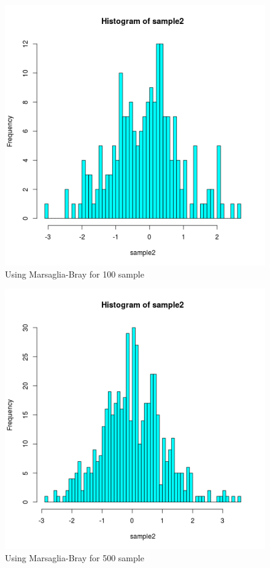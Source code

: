 \documentclass{article}
\begin{document}
		
			\begin{figure}
  			\includegraphics[width=\linewidth]{pic/que1_hund_2.png}
 			 \caption{Using Marsaglia-Bray for 100 sample} 
  			\label{fig:hist1}
		\end{figure}
	
			\begin{figure}
  			\includegraphics[width=\linewidth]{pic/que1_five-hund_2.png}
 			 \caption{Using Marsaglia-Bray for 500 sample} 
  			\label{fig:hist1}
		\end{figure}
	
\end{document}

